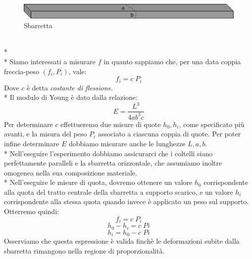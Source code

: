 \documentclass[10pt,a4paper]{book}
\begin{document}
\begin{figure}[h]
	\centering
	\includegraphics[width=0.7\linewidth]{sbarretta}
	\caption{Sbarretta}
	\label{fig:sbarr}
\end{figure}
\\*\\*
Siamo interessati a misurare $f$ in quanto sappiamo che, per una data coppia freccia-peso $(f_i, P_i)$, vale:
$$
f_i = c\;P_i
$$
Dove $c$ è detta \emph{costante di flessione}.\\*
Il modulo di Young è dato dalla relazione:
$$
E = \frac{L^3}{4ab^3c}
$$
Per determinare $c$ effettueremo due misure di quote $h_0, h_i$, come specificato più avanti, e la misura del peso $P_i$ associato a ciascuna coppia di quote. Per poter infine determinare $E$ dobbiamo misurare anche le lunghezze $L, a, b$.\\*
Nell'eseguire l'esperimento dobbiamo assicurarci che i coltelli siano perfettamente paralleli e la sbarretta orizzontale, che assumiamo inoltre omogenea nella sua composizione materiale.\\*
Nell'eseguire le misure di quota, dovremo ottenere un valore $h_0$ corrispondente alla quota del tratto centrale della sbarretta a supporto scarico, e un valore $h_i$ corrispondente alla stessa quota quando invece è applicato un peso sul supporto. Otterremo quindi:
$$
f_i = c\;P_i
$$
$$
h_0 - h_i = c\;Pi
$$
$$
h_i = h_0 - c\;Pi
$$
Osserviamo che questa espressione è valida finchè le deformazioni subite dalla sbarretta rimangono nella regione di proporzionalità.
\end{document}
